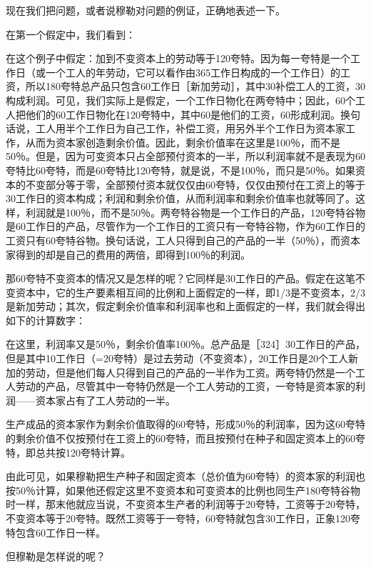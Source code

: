现在我们把问题，或者说穆勒对问题的例证，正确地表述一下。

在第一个假定中，我们看到：

\todo{}

在这个例子中假定：加到不变资本上的劳动等于120夸特。因为每一夸特是一个工作日（或一个工人的年劳动，它可以看作由365工作日构成的一个工作日）的工资，所以180夸特总产品只包含60工作日［新加劳动］，其中30补偿工人的工资，30构成利润。可见，我们实际上是假定，一个工作日物化在两夸特中；因此，60个工人把他们的60工作日物化在120夸特中，其中60是他们的工资，60形成利润。换句话说，工人用半个工作日为自己工作，补偿工资，用另外半个工作日为资本家工作，从而为资本家创造剩余价值。因此，剩余价值率在这里是100％，而不是50％。但是，因为可变资本只占全部预付资本的一半，所以利润率就不是表现为60夸特比60夸特，而是60夸特比120夸特，就是说，不是100％，而只是50％。如果资本的不变部分等于零，全部预付资本就仅仅由60夸特，仅仅由预付在工资上的等于30工作日的资本构成；利润和剩余价值，从而利润率和剩余价值率也就等同了。这样，利润就是100％，而不是50％。两夸特谷物是一个工作日的产品，120夸特谷物是60工作日的产品，尽管作为一个工作日的工资只有一夸特谷物，作为60工作日的工资只有60夸特谷物。换句话说，工人只得到自己的产品的一半（50％），而资本家得到的却是自己的费用的两倍，即得到100％的利润。

那60夸特不变资本的情况又是怎样的呢？它同样是30工作日的产品。假定在这笔不变资本中，它的生产要素相互间的比例和上面假定的一样，即1/3是不变资本，2/3是新加劳动；其次，假定剩余价值率和利润率也和上面假定的一样，我们就会得出如下的计算数字：

\todo{}

在这里，利润率又是50％，剩余价值率100％。总产品是［324］30工作日的产品，但是其中10工作日（=20夸特）是过去劳动（不变资本），20工作日是20个工人新加的劳动，但是他们每人只得到自己的产品的一半作为工资。两夸特仍然是一个工人劳动的产品，尽管其中一夸特仍然是一个工人劳动的工资，一夸特是资本家的利润——资本家占有了工人劳动的一半。

生产成品的资本家作为剩余价值取得的60夸特，形成50％的利润率，因为这60夸特的剩余价值不仅按预付在工资上的60夸特，而且按预付在种子和固定资本上的60夸特，即总共按120夸特计算。

由此可见，如果穆勒把生产种子和固定资本（总价值为60夸特）的资本家的利润也按50％计算，如果他还假定这里不变资本和可变资本的比例也同生产180夸特谷物时一样，那末他就应当说，不变资本生产者的利润等于20夸特，工资等于20夸特，不变资本等于20夸特。既然工资等于一夸特，60夸特就包含30工作日，正象120夸特包含60工作日一样。

但穆勒是怎样说的呢？

